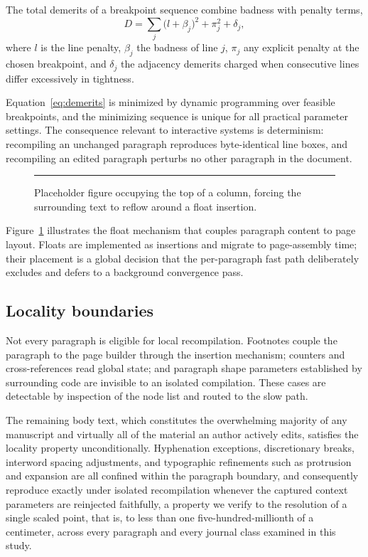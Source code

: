 The total demerits of a breakpoint sequence combine badness with penalty
terms,
\begin{equation}
D = \sum_{j} \bigl( l + \beta_j \bigr)^2 + \pi_j^2 + \delta_j,
\label{eq:demerits}
\end{equation}
where $l$ is the line penalty, $\beta_j$ the badness of line $j$, $\pi_j$
any explicit penalty at the chosen breakpoint, and $\delta_j$ the adjacency
demerits charged when consecutive lines differ excessively in tightness.

Equation~\ref{eq:demerits} is minimized by dynamic programming over feasible
breakpoints, and the minimizing sequence is unique for all practical
parameter settings. The consequence relevant to interactive systems is
determinism: recompiling an unchanged paragraph reproduces byte-identical
line boxes, and recompiling an edited paragraph perturbs no other paragraph
in the document.

\begin{figure}[t]
\centering
\rule{0.8\linewidth}{3.2cm}
\caption{Placeholder figure occupying the top of a column, forcing the
surrounding text to reflow around a float insertion.}
\label{fig:placeholder}
\end{figure}

Figure~\ref{fig:placeholder} illustrates the float mechanism that couples
paragraph content to page layout. Floats are implemented as insertions and
migrate to page-assembly time; their placement is a global decision that the
per-paragraph fast path deliberately excludes and defers to a background
convergence pass.

\subsection{Locality boundaries}

Not every paragraph is eligible for local recompilation. Footnotes couple
the paragraph to the page builder through the insertion mechanism; counters
and cross-references read global state; and paragraph shape parameters
established by surrounding code are invisible to an isolated compilation.
These cases are detectable by inspection of the node list and routed to the
slow path.

The remaining body text, which constitutes the overwhelming majority of any
manuscript and virtually all of the material an author actively edits,
satisfies the locality property unconditionally. Hyphenation exceptions,
discretionary breaks, interword spacing adjustments, and typographic
refinements such as protrusion and expansion are all confined within the
paragraph boundary, and consequently reproduce exactly under isolated
recompilation whenever the captured context parameters are reinjected
faithfully, a property we verify to the resolution of a single scaled point,
that is, to less than one five-hundred-millionth of a centimeter, across
every paragraph and every journal class examined in this study.

